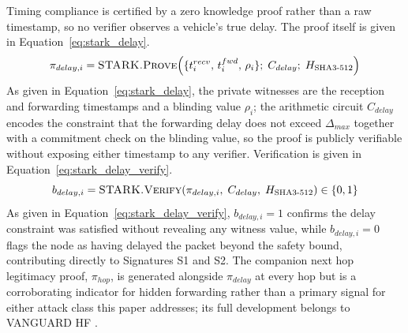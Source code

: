 \documentclass[final,5p,twocolumn]{elsarticle}
\theoremstyle{remark}
\theoremstyle{plain}
\begin{document}
Timing compliance is certified by a zero knowledge proof rather than a raw
timestamp, so no verifier observes a vehicle's true delay. The proof itself
is given in Equation~\eqref{eq:stark_delay}.
\begin{equation}
	\pi_{delay,i} = \textsc{STARK.Prove}\!\left(\{t^{recv}_i,\, t^{fwd}_i,\, \rho_i\};\; C_{delay};\; H_{\text{SHA3-512}}\right)
	\label{eq:stark_delay}
\end{equation}
As given in Equation~\eqref{eq:stark_delay}, the private witnesses are the
reception and forwarding timestamps and a blinding value $\rho_i$; the
arithmetic circuit $C_{delay}$ encodes the constraint that the forwarding
delay does not exceed $\Delta_{max}$ together with a commitment check on the
blinding value, so the proof is publicly verifiable without exposing either
timestamp to any verifier. Verification is given in
Equation~\eqref{eq:stark_delay_verify}.
\begin{equation}
	b_{delay,i} = \textsc{STARK.Verify}\!\left(\pi_{delay,i},\; C_{delay},\; H_{\text{SHA3-512}}\right) \in \{0, 1\}
	\label{eq:stark_delay_verify}
\end{equation}
As given in Equation~\eqref{eq:stark_delay_verify}, $b_{delay,i} = 1$
confirms the delay constraint was satisfied without revealing any witness
value, while $b_{delay,i} = 0$ flags the node as having delayed the packet
beyond the safety bound, contributing directly to Signatures S1 and S2. The
companion next hop legitimacy proof, $\pi_{hop}$, is generated alongside
$\pi_{delay}$ at every hop but is a corroborating indicator for hidden
forwarding rather than a primary signal for either attack class this paper
addresses; its full development belongs to VANGUARD HF
\cite{VanguardHF2026}.
\end{document}
